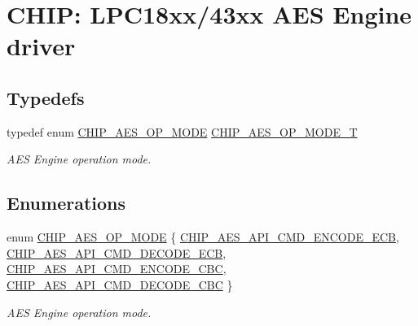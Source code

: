 \hypertarget{group___a_e_s__18_x_x__43_x_x}{}\section{C\+H\+IP\+: L\+P\+C18xx/43xx A\+ES Engine driver}
\label{group___a_e_s__18_x_x__43_x_x}
\subsection*{Typedefs}
\begin{DoxyCompactItemize}
\item 
typedef enum \hyperlink{group___a_e_s__18_x_x__43_x_x_gae6ec18c3dfb817d9b4440eaaf6edd3e5}{C\+H\+I\+P\+\_\+\+A\+E\+S\+\_\+\+O\+P\+\_\+\+M\+O\+DE} \hyperlink{group___a_e_s__18_x_x__43_x_x_ga8dd50510d4144a9b12042487fdd42813}{C\+H\+I\+P\+\_\+\+A\+E\+S\+\_\+\+O\+P\+\_\+\+M\+O\+D\+E\+\_\+T}
\begin{DoxyCompactList}\small\item\em A\+ES Engine operation mode. \end{DoxyCompactList}\end{DoxyCompactItemize}
\subsection*{Enumerations}
\begin{DoxyCompactItemize}
\item 
enum \hyperlink{group___a_e_s__18_x_x__43_x_x_gae6ec18c3dfb817d9b4440eaaf6edd3e5}{C\+H\+I\+P\+\_\+\+A\+E\+S\+\_\+\+O\+P\+\_\+\+M\+O\+DE} \{ \hyperlink{group___a_e_s__18_x_x__43_x_x_ggae6ec18c3dfb817d9b4440eaaf6edd3e5aaa2c8e546a8d970a23bb38111f272110}{C\+H\+I\+P\+\_\+\+A\+E\+S\+\_\+\+A\+P\+I\+\_\+\+C\+M\+D\+\_\+\+E\+N\+C\+O\+D\+E\+\_\+\+E\+CB}, 
\hyperlink{group___a_e_s__18_x_x__43_x_x_ggae6ec18c3dfb817d9b4440eaaf6edd3e5a33044f589a3b1d9a094d8dd2635b7ed0}{C\+H\+I\+P\+\_\+\+A\+E\+S\+\_\+\+A\+P\+I\+\_\+\+C\+M\+D\+\_\+\+D\+E\+C\+O\+D\+E\+\_\+\+E\+CB}, 
\hyperlink{group___a_e_s__18_x_x__43_x_x_ggae6ec18c3dfb817d9b4440eaaf6edd3e5a86756b506cee0fc90a336bcc0322328c}{C\+H\+I\+P\+\_\+\+A\+E\+S\+\_\+\+A\+P\+I\+\_\+\+C\+M\+D\+\_\+\+E\+N\+C\+O\+D\+E\+\_\+\+C\+BC}, 
\hyperlink{group___a_e_s__18_x_x__43_x_x_ggae6ec18c3dfb817d9b4440eaaf6edd3e5a81bf8f9bd1f4847c05c8ce5c93f1dc1b}{C\+H\+I\+P\+\_\+\+A\+E\+S\+\_\+\+A\+P\+I\+\_\+\+C\+M\+D\+\_\+\+D\+E\+C\+O\+D\+E\+\_\+\+C\+BC}
 \}\begin{DoxyCompactList}\small\item\em A\+ES Engine operation mode. \end{DoxyCompactList}
\end{DoxyCompactItemize}
